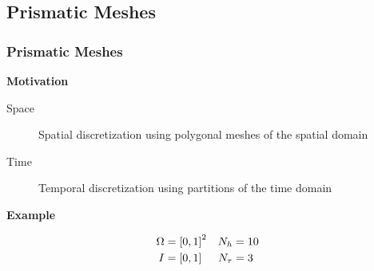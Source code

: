 \subsection{Prismatic Meshes}

\begin{frame}
    \frametitle{Prismatic Meshes}

    \vspace*{\fill}
    \begin{multicols}{2}
        
        \vspace*{\fill}
        \begin{center}
            {\color{\accentcolor} \Large \textbf{Motivation}}
            \vspace*{0.25cm}

            \begin{minipage}{0.4\textwidth}
                \begin{description}
                    \item[Space] Spatial discretization using polygonal meshes of the spatial domain
                    \item[Time] Temporal discretization using partitions of the time domain
                \end{description}
            \end{minipage}
        \end{center}

        \vspace*{\fill}

        \begin{center}
            {\color{\accentcolor} \Large \textbf{Example}}

            \begin{minipage}{0.4\textwidth}
                \begin{align*}
                    \Omega &= \left[ 0, 1 \right]^2 & N_h &= 10 \\
                    I &= \left[ 0, 1 \right] & N_{\tau} &= 3
                \end{align*}
            \end{minipage}
        \end{center}
        \vspace*{\fill}

        \vfill\null
        \columnbreak

        \vspace*{\fill}
        \begin{figure}[!ht]
            \centering
            
        \end{figure}
        \vspace*{\fill}

    \end{multicols}
    \vspace*{\fill}
    
\end{frame}


